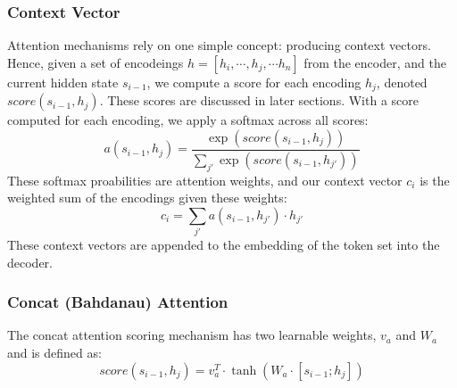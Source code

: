 \documentclass[twoside,twocolumn]{article}
\begin{document}
\subsubsection{Context Vector}
Attention mechanisms rely on one simple concept: producing context vectors.
Hence, given a set of encodeings $h = \left[h_i, \cdots, h_j, \cdots h_n \right]$
from the encoder, and the current hidden state $s_{i-1}$, we compute a score
for each encoding $h_j$, denoted $score(s_{i-1}, h_j)$. These scores are discussed
in later sections. With a score computed for each encoding, we apply a softmax
across all scores:
\begin{equation}
  a(s_{i-1}, h_j) = \frac{\exp(score(s_{i-1}, h_j))}{\sum_{j'} \exp(score(s_{i-1}, h_{j'}))}
\end{equation}
These softmax proabilities are attention weights, and our context vector $c_i$
is the weighted sum of the encodings given these weights:
\begin{equation}
  c_i = \sum_{j'} a(s_{i-1}, h_{j'}) \cdot h_{j'}
\end{equation}
These context vectors are appended to the embedding of the token set into the decoder.
\subsubsection{Concat (Bahdanau) Attention}
The concat attention scoring mechanism has two learnable weights, $v_a$ and $W_a$
and is defined as:
\begin{equation}
  score(s_{i-1}, h_j) = v_a^T \cdot \tanh \left( W_a \cdot \left[ s_{i-1} ; h_j \right] \right)
\end{equation}
\end{document}
